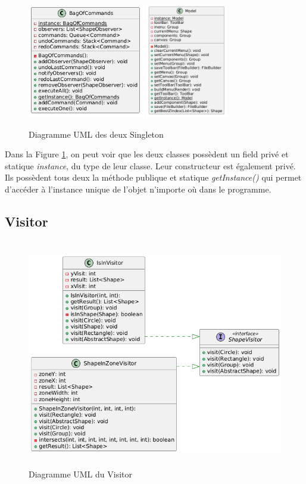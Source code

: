 \documentclass{article}
\begin{document}
\begin{figure}[h]
    \centering
    \includegraphics[width=\textwidth,height=5.0cm,keepaspectratio]{singleton.png}
    \includegraphics[width=\textwidth,height=5.0cm,keepaspectratio]{singleton2.png}
    \caption{Diagramme UML des deux Singleton}
    \label{Singleton}
\end{figure}
\FloatBarrier

Dans la Figure \ref{Singleton}, on peut voir que les deux classes possèdent un field privé et statique \textit{instance}, du type de leur classe.
Leur constructeur est également privé. Ils possèdent tous deux la méthode publique et statique \textit{getInstance()} qui permet
d'accéder à l'instance unique de l'objet n'importe où dans le programme.

\subsection{Visitor}

\begin{figure}[h]
    \centering
    \includegraphics[width=\textwidth,height=10.0cm,keepaspectratio]{visitor.png}
    \caption{Diagramme UML du Visitor}
    \label{Visitor}
\end{figure}
\FloatBarrier
\end{document}
